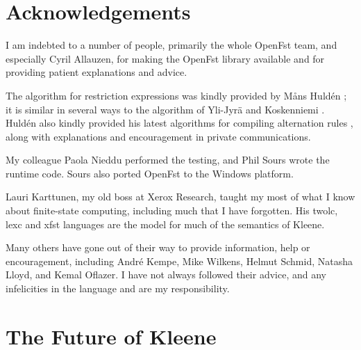 \section{Acknowledgements}

I am indebted to a number of people, primarily the whole OpenFst team,
and especially Cyril Allauzen, for making the OpenFst library
\citep{allauzen+riley+schalkwyk+skut+mohri:2007} available and for
providing patient explanations and advice.

The algorithm for restriction expressions was kindly provided by M\r{a}ns
Huld\'en \citep{hulden:2009fsmnlp,hulden:2009thesis}; it is similar in
several ways to the algorithm of Yli-Jyr\"a and Koskenniemi
\citep{yli-jyra+koskenniemi:2004}.  Huld\'en also kindly provided his
latest algorithms for compiling alternation rules
\citep{hulden:2009thesis}, along with explanations and encouragement in
private communications.

My  colleague Paola Nieddu performed the testing, and Phil
Sours wrote the   runtime code.  Sours also
ported OpenFst to the Windows platform.

Lauri Karttunen, my old boss at Xerox Research, taught my most of what I know about finite-state
computing, including much that I have forgotten.  His twolc, lexc and xfst languages are the model for
much of the semantics of Kleene.

Many others have gone out of their way to provide information, help or
encouragement, including Andr\'e Kempe, Mike Wilkens,
Helmut Schmid, Natasha Lloyd, and Kemal Oflazer.  I have not always
followed their advice, and any infelicities in the \Kleene{} language and
 are my responsibility.

\section{The Future of Kleene}

